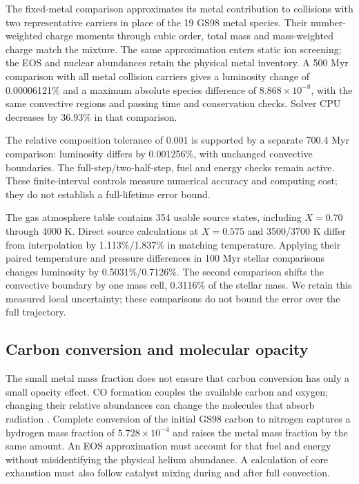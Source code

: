 \documentclass[11pt,letterpaper]{article}
\begin{document}
The fixed-metal comparison approximates its metal contribution to collisions
with two representative
carriers in place of the 19 GS98 metal species. Their number-weighted charge
moments through cubic order, total mass and mass-weighted charge match the
mixture. The same approximation enters static ion screening; the EOS and
nuclear abundances retain the physical metal inventory. A 500 Myr comparison
with all metal collision carriers gives a luminosity change of
0.00006121\% and a maximum absolute species difference of
$8.868\times10^{-8}$, with the same convective regions and passing time and
conservation checks. Solver CPU decreases by 36.93\% in that comparison.

The relative composition tolerance of 0.001 is supported by a separate
700.4 Myr comparison: luminosity differs by 0.001256\%, with unchanged
convective boundaries. The full-step/two-half-step, fuel and energy checks
remain active. These finite-interval controls measure numerical accuracy
and computing cost; they do not establish a full-lifetime error bound.

The gas atmosphere table contains 354 usable source states, including
$X=0.70$ through 4000 K. Direct source calculations at $X=0.575$ and
3500/3700 K differ from interpolation by 1.113\%/1.837\% in matching
temperature. Applying their paired temperature and pressure differences in
100 Myr stellar comparisons changes luminosity by 0.5031\%/0.7126\%.
The second comparison shifts the convective boundary by one mass cell,
0.3116\% of the stellar mass. We retain this measured local uncertainty;
these comparisons do not bound the error over the full trajectory.

\subsection{Carbon conversion and molecular opacity}
The small metal mass fraction does not ensure that carbon conversion has
only a small opacity effect. CO formation couples the available carbon and
oxygen; changing their relative abundances can change the molecules that
absorb radiation \cite{lederer09}. Complete conversion of the initial
GS98 carbon to nitrogen captures a hydrogen mass fraction of
$5.728\times10^{-4}$ and raises the metal mass fraction by the same amount.
An EOS approximation must account for that fuel and energy without
misidentifying the physical helium abundance. A calculation of core
exhaustion must also follow catalyst mixing during and after full convection.
\end{document}
